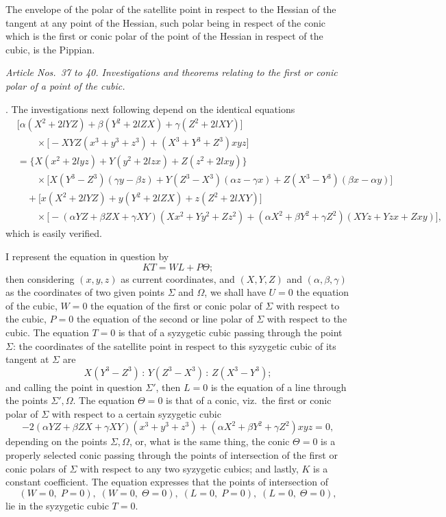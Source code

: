 \documentclass[11pt]{article}
\begin{document}
The envelope of the polar of the satellite point in respect to the Hessian of the tangent at any point of the Hessian, such polar being in respect of the conic which is the first or conic polar of the point of the Hessian in respect of the cubic, is the Pippian.

\medskip

\textit{Article Nos.~37 to 40. Investigations and theorems relating to the first or conic polar of a point of the cubic.}

\medskip

. The investigations next following depend on the identical equations
\begin{align*}
&\bigl[\alpha(X^2 + 2 l Y Z) + \beta(Y^2 + 2 l Z X) + \gamma(Z^2 + 2 l X Y)\bigr] \\
&\qquad \times \bigl[-X Y Z(x^3 + y^3 + z^3) + (X^3 + Y^3 + Z^3) x y z\bigr] \\[1ex]
&= \bigl\{X(x^2 + 2 l y z) + Y(y^2 + 2 l z x) + Z(z^2 + 2 l x y)\bigr\} \\
&\qquad \times \bigl[X(Y^3 - Z^3)(\gamma y - \beta z) + Y(Z^3 - X^3)(\alpha z - \gamma x) + Z(X^3 - Y^3)(\beta x - \alpha y)\bigr] \\[1ex]
&\quad + \bigl[x(X^2 + 2 l Y Z) + y(Y^2 + 2 l Z X) + z(Z^2 + 2 l X Y)\bigr] \\
&\qquad \times \bigl[-(\alpha Y Z + \beta Z X + \gamma X Y)(X x^2 + Y y^2 + Z z^2) + (\alpha X^2 + \beta Y^2 + \gamma Z^2)(X Y z + Y z x + Z x y)\bigr],
\end{align*}
which is easily verified.

I represent the equation in question by
\[
K T = W L + P \Theta;
\]
then considering $(x, y, z)$ as current coordinates, and $(X, Y, Z)$ and $(\alpha, \beta, \gamma)$ as the coordinates of two given points $\Sigma$ and $\Omega$, we shall have $U = 0$ the equation of the cubic, $W = 0$ the equation of the first or conic polar of $\Sigma$ with respect to the cubic, $P = 0$ the equation of the second or line polar of $\Sigma$ with respect to the cubic. The equation $T = 0$ is that of a syzygetic cubic passing through the point $\Sigma$: the coordinates of the satellite point in respect to this syzygetic cubic of its tangent at $\Sigma$ are
\[
X(Y^3 - Z^3) \,:\, Y(Z^3 - X^3) \,:\, Z(X^3 - Y^3);
\]
and calling the point in question $\Sigma'$, then $L = 0$ is the equation of a line through the points $\Sigma', \Omega$. The equation $\Theta = 0$ is that of a conic, viz.\ the first or conic polar of $\Sigma$ with respect to a certain syzygetic cubic
\[
-2(\alpha Y Z + \beta Z X + \gamma X Y)(x^3 + y^3 + z^3) + (\alpha X^2 + \beta Y^2 + \gamma Z^2) x y z = 0,
\]
depending on the points $\Sigma, \Omega$, or, what is the same thing, the conic $\Theta = 0$ is a properly selected conic passing through the points of intersection of the first or conic polars of $\Sigma$ with respect to any two syzygetic cubics; and lastly, $K$ is a constant coefficient. The equation expresses that the points of intersection of
\[
(W = 0,\; P = 0),\;(W = 0,\; \Theta = 0),\;(L = 0,\; P = 0),\;(L = 0,\; \Theta = 0),
\]
lie in the syzygetic cubic $T = 0$.
\end{document}
